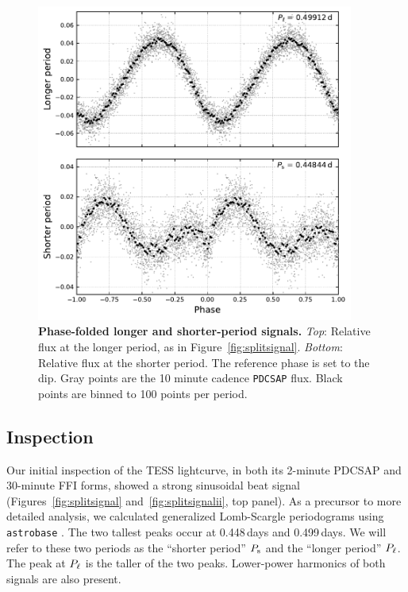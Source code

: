 \documentclass[12pt,twocolumn,tighten]{aastex62}
\begin{document}
\begin{figure}[t]
	\begin{center}
		\leavevmode
		\includegraphics[width=0.93\textwidth]{f3.pdf}
	\end{center}
	\vspace{-0.7cm}
	\caption{ {\bf Phase-folded longer and shorter-period signals.}
    {\it Top}: Relative flux at the longer period, as in
    Figure~\ref{fig:splitsignal}.  {\it Bottom}: Relative flux at the
    shorter period. The reference phase is set to the dip.  Gray
    points are the 10 minute cadence \texttt{PDCSAP} flux.  Black
    points are binned to 100 points per period.
		\label{fig:phasefold}
	}
\end{figure}

\subsection{Inspection}

Our initial inspection of the TESS lightcurve, in both its 2-minute
PDCSAP and 30-minute FFI forms, showed a strong sinusoidal beat signal
(Figures~\ref{fig:splitsignal} and~\ref{fig:splitsignalii}, top
panel). As a precursor to more detailed analysis, we calculated
generalized Lomb-Scargle periodograms using \texttt{astrobase}
\citep{lomb_1976,scargle_studies_1982,vanderplas_periodograms_2015,bhatti_astrobase_2018}.
The two tallest peaks occur at 0.448\,days and 0.499\,days.  We will
refer to these two periods as the ``shorter period'' $P_{\rm s}$ and
the ``longer period'' $P_{\rm \ell}$.  The peak at $P_{\rm \ell}$ is
the taller of the two peaks.  Lower-power harmonics of both signals
are also present.
\end{document}
